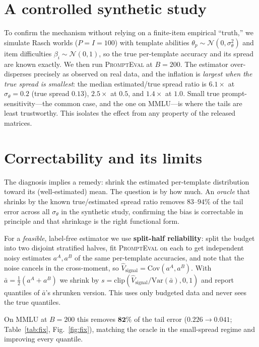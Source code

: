 \documentclass[11pt]{article}
\newcommand{\pe}{\textsc{PromptEval}}
\begin{document}
\section{A controlled synthetic study}\label{sec:synth}
To confirm the mechanism without relying on a finite-item empirical ``truth,'' we simulate
Rasch worlds ($P{=}I{=}100$) with template abilities $\theta_p\sim\mathcal N(0,\sigma_\theta^2)$
and item difficulties $\beta_i\sim\mathcal N(0,1)$, so the true per-template accuracy and its
spread are known exactly. We then run \pe{} at $B{=}200$. The estimator over-disperses precisely
as observed on real data, and the inflation is \emph{largest when the true spread is smallest}:
the median estimated/true spread ratio is $6.1\times$ at $\sigma_\theta{=}0.2$ (true spread
$0.13$), $2.5\times$ at $0.5$, and $1.4\times$ at $1.0$. Small true prompt-sensitivity---the
common case, and the one on MMLU---is where the tails are least trustworthy. This isolates the
effect from any property of the released matrices.

\section{Correctability and its limits}\label{sec:fix}
The diagnosis implies a remedy: shrink the estimated per-template distribution toward its
(well-estimated) mean. The question is by how much. An \emph{oracle} that shrinks by the known
true/estimated spread ratio removes $83$--$94\%$ of the tail error across all $\sigma_\theta$ in
the synthetic study, confirming the bias is correctable in principle and that shrinkage is the
right functional form.

For a \emph{feasible}, label-free estimator we use \textbf{split-half reliability}: split the
budget into two disjoint stratified halves, fit \pe{} on each to get independent noisy estimates
$a^{A},a^{B}$ of the same per-template accuracies, and note that the noise cancels in the
cross-moment, so $\widehat{V}_{\text{signal}}=\mathrm{Cov}(a^{A},a^{B})$. With
$\bar a=\tfrac12(a^A+a^B)$ we shrink by $s=\mathrm{clip}(\widehat V_{\text{signal}}/
\mathrm{Var}(\bar a),0,1)$ and report quantiles of $\bar a$'s shrunken version. This uses only
budgeted data and never sees the true quantiles.

On MMLU at $B{=}200$ this removes $\mathbf{82\%}$ of the tail error ($0.226\!\to\!0.041$;
Table~\ref{tab:fix}, Fig.~\ref{fig:fix}), matching the oracle in the small-spread regime and
improving every quantile.
\end{document}
